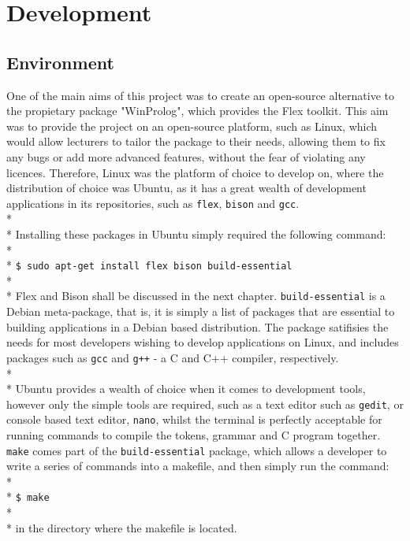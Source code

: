 \documentclass[10pt]{report}
\begin{document}
\section{Development}\label{sec:development}
\subsection{Environment}\label{subsec:dev_environment}
One of the main aims of this project was to create an open-source alternative to the propietary package "WinProlog", which provides the Flex toolkit.  This aim was to provide the project on an open-source platform, such as Linux, which would allow lecturers to tailor the package to their needs, allowing them to fix any bugs or add more advanced features, without the fear of violating any licences.  Therefore, Linux was the platform of choice to develop on, where the distribution of choice was Ubuntu, as it has a great wealth of development applications in its repositories, such as \texttt{flex}, \texttt{bison} and \texttt{gcc}.
\\*
\\*
Installing these packages in Ubuntu simply required the following command:
\\*
\\*
\texttt{\$ sudo apt-get install flex bison build-essential}
\\*
\\*
Flex and Bison shall be discussed in the next chapter.  \texttt{build-essential} is a Debian meta-package, that is, it is simply a list of packages that are essential to building applications in a Debian based distribution.  The package satifisies the needs for most developers wishing to develop applications on Linux, and includes packages such as \texttt{gcc} and \texttt{g++} - a C and C++ compiler, respectively.
\\*
\\*
Ubuntu provides a wealth of choice when it comes to development tools, however only the simple tools are required, such as a text editor such as \texttt{gedit}, or console based text editor, \texttt{nano}, whilst the terminal is perfectly acceptable for running commands to compile the tokens, grammar and C program together.  \texttt{make} comes part of the \texttt{build-essential} package, which allows a developer to write a series of commands into a makefile, and then simply run the command:\\*\\*
\texttt{\$ make}
\\*
\\*
in the directory where the makefile is located.
\end{document}
